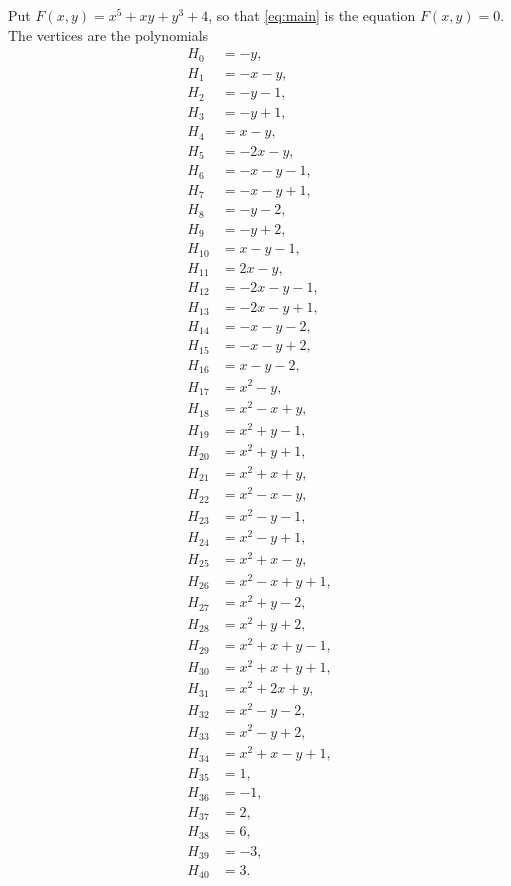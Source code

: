 \documentclass[11pt]{article}
\begin{document}
Put $F(x,y)=x^{5}+xy+y^{3}+4$, so that \eqref{eq:main} is the equation $F(x,y)=0$. The vertices are the polynomials
\begin{align*}
H_{0}&=-y,\\
H_{1}&=-x-y,\\
H_{2}&=-y-1,\\
H_{3}&=-y+1,\\
H_{4}&=x-y,\\
H_{5}&=-2x-y,\\
H_{6}&=-x-y-1,\\
H_{7}&=-x-y+1,\\
H_{8}&=-y-2,\\
H_{9}&=-y+2,\\
H_{10}&=x-y-1,\\
H_{11}&=2x-y,\\
H_{12}&=-2x-y-1,\\
H_{13}&=-2x-y+1,\\
H_{14}&=-x-y-2,\\
H_{15}&=-x-y+2,\\
H_{16}&=x-y-2,\\
H_{17}&=x^{2}-y,\\
H_{18}&=x^{2}-x+y,\\
H_{19}&=x^{2}+y-1,\\
H_{20}&=x^{2}+y+1,\\
H_{21}&=x^{2}+x+y,\\
H_{22}&=x^{2}-x-y,\\
H_{23}&=x^{2}-y-1,\\
H_{24}&=x^{2}-y+1,\\
H_{25}&=x^{2}+x-y,\\
H_{26}&=x^{2}-x+y+1,\\
H_{27}&=x^{2}+y-2,\\
H_{28}&=x^{2}+y+2,\\
H_{29}&=x^{2}+x+y-1,\\
H_{30}&=x^{2}+x+y+1,\\
H_{31}&=x^{2}+2x+y,\\
H_{32}&=x^{2}-y-2,\\
H_{33}&=x^{2}-y+2,\\
H_{34}&=x^{2}+x-y+1,\\
H_{35}&=1,\\
H_{36}&=-1,\\
H_{37}&=2,\\
H_{38}&=6,\\
H_{39}&=-3,\\
H_{40}&=3.
\end{align*}
\end{document}
